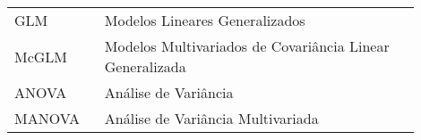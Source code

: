 

\begin{listaacron}

\begin{longtable}[l]{p{0.2\linewidth}p{0.7\linewidth}}

GLM & Modelos Lineares Generalizados\\
McGLM & Modelos Multivariados de Covariância Linear Generalizada\\
ANOVA & Análise de Variância\\
MANOVA & Análise de Variância Multivariada

\end{longtable}

\end{listaacron}

